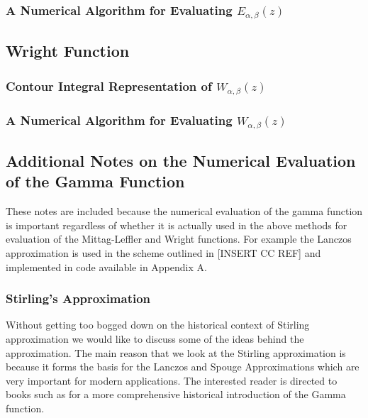 \subsubsection{A Numerical Algorithm for Evaluating $ E_{\alpha, \beta}(z) $}
\label{sec:mit_lef_numerical}
\subsection{Wright Function}
    
\subsubsection{Contour Integral Representation of $ W_{\alpha, \beta}(z) $}

\subsubsection{A Numerical Algorithm for Evaluating $ W_{\alpha, \beta}(z) $}

\subsection{Additional Notes on the Numerical Evaluation of the Gamma Function}
\label{sec:num-gamma}
These notes are included because the numerical evaluation of the gamma function is important regardless of
whether it is actually used in the above methods for evaluation of the Mittag-Leffler and Wright functions.
For example the Lanczos approximation is used in the scheme outlined in [INSERT CC REF] and implemented 
in code available in Appendix A.

\subsubsection{Stirling's Approximation}

Without getting too bogged down on the historical context of Stirling approximation we would like to discuss some of the ideas behind the approximation. The main reason that we look at the Stirling approximation is because it forms the basis for the Lanczos and Spouge Approximations which are very important for modern applications. The interested reader is directed to books such as \cite{Whittaker1996, Paris2001} for a more comprehensive historical introduction of the Gamma function.

